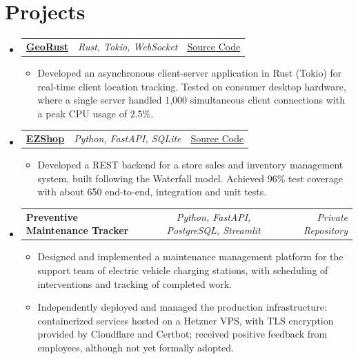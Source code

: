 \documentclass[a4paper,11pt]{article}
\makeatletter
\newcommand{\bodyfs}{\fontsize{10.3pt}{12.5pt}\selectfont}   %
\newcommand{\resumeItem}[1]{
  \item\bodyfs #1
}
\newcommand{\resumeItemListStart}{\begin{itemize}[leftmargin=1.4em, rightmargin=0pt, itemsep=1.5pt plus 1pt, topsep=2.5pt plus 1pt, parsep=0pt, partopsep=0pt]}
\newcommand{\resumeItemListEnd}{\end{itemize}}
\newcommand{\resumeTrioHeading}[3]{
  \item\bodyfs
    \begin{tabular*}{\linewidth}[t]{
      l@{\extracolsep{\fill}}c@{\extracolsep{\fill}}r
    }
      \textbf{#1} & \textit{#2} & #3
    \end{tabular*}
}
\newcommand{\resumeHeadingListStart}{
  \begin{itemize}[leftmargin=0pt, label={}, itemsep=6pt plus 3pt minus 1pt, topsep=0pt, parsep=0pt, partopsep=0pt]
}
\newcommand{\resumeHeadingListEnd}{\end{itemize}}
\makeatother
\begin{document}
\section{Projects}
  \resumeHeadingListStart{}
    \resumeTrioHeading{\href{https://github.com/amedeo03/georust}{\uline{GeoRust}}}{Rust, Tokio, WebSocket}{\href{https://github.com/amedeo03/georust}{\uline{Source Code}}}
      \resumeItemListStart{}
        \resumeItem{Developed an asynchronous client-server application in Rust (Tokio) for real-time client location tracking. Tested on consumer desktop hardware, where a single server handled 1,000 simultaneous client connections with a peak CPU usage of 2.5\%.}
      \resumeItemListEnd{}

    \resumeTrioHeading{\href{https://github.com/amedeo03/EZShop}{\uline{EZShop}}}{Python, FastAPI, SQLite}{\href{https://github.com/amedeo03/EZShop}{\uline{Source Code}}}
      \resumeItemListStart{}
        \resumeItem{Developed a REST backend for a store sales and inventory management system, built following the Waterfall model. Achieved 96\% test coverage with about 650 end-to-end, integration and unit tests.}
      \resumeItemListEnd{}

    \resumeTrioHeading{Preventive Maintenance Tracker}{Python, FastAPI, PostgreSQL, Streamlit}{\textit{Private Repository}}
      \resumeItemListStart{}
        \resumeItem{Designed and implemented a maintenance management platform for the support team of electric vehicle charging stations, with scheduling of interventions and tracking of completed work.}
        \resumeItem{Independently deployed and managed the production infrastructure: containerized services hosted on a Hetzner VPS, with TLS encryption provided by Cloudflare and Certbot; received positive feedback from employees, although not yet formally adopted.}
      \resumeItemListEnd{}
  \resumeHeadingListEnd{}
\end{document}
